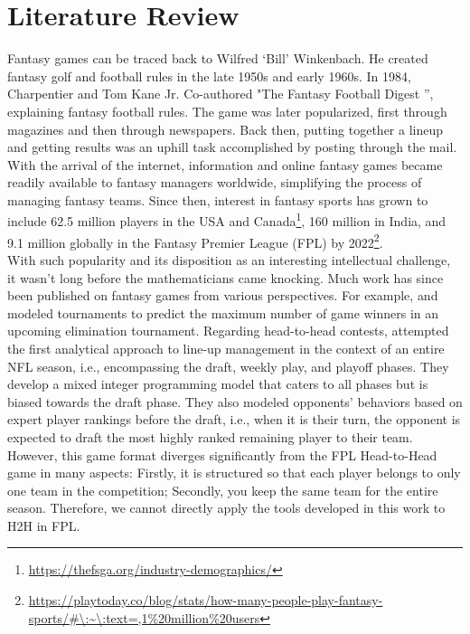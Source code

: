 \documentclass[12pt,oneside,a4paper]{book}
\theoremstyle{definition}
\theoremstyle{remark}
\begin{document}
		\chapter{Literature Review}
			Fantasy games can be traced back to Wilfred ‘Bill’ Winkenbach. He created fantasy golf and football rules in the late 1950s and early 1960s. In 1984, Charpentier and Tom Kane Jr. Co-authored "The Fantasy Football Digest '', explaining fantasy football rules. The game was later popularized, first through magazines and then through newspapers.  Back then, putting together a lineup and getting results was an uphill task accomplished by posting through the mail. With the arrival of the internet, information and online fantasy games became readily available to fantasy managers worldwide, simplifying the process of managing fantasy teams. Since then, interest in fantasy sports has grown to include 62.5 million players in the USA and Canada\footnote{\url{https://thefsga.org/industry-demographics/}}, 160 million in India, and 9.1 million globally in the Fantasy Premier League (FPL) by 2022\footnote{\url{https://playtoday.co/blog/stats/how-many-people-play-fantasy-sports/\#\:\~\:text=,1\%20million\%20users}}.
			\\
			With such popularity and its disposition as an interesting intellectual challenge, it wasn’t long before the mathematicians came knocking. Much work has since been published on fantasy games from various perspectives. For example, \cite{Kaplan_Garstka_2001}  and \citet{Clair_Letscher_2007} modeled tournaments to predict the maximum number of game winners in an upcoming elimination tournament. Regarding head-to-head contests, \cite{becker2016analytical} attempted the first analytical approach to line-up management in the context of an entire NFL season, i.e., encompassing the draft, weekly play, and playoff phases. They develop a mixed integer programming model that caters to all phases but is biased towards the draft phase. They also modeled opponents' behaviors based on expert player rankings before the draft, i.e., when it is their turn, the opponent is expected to draft the most highly ranked remaining player to their team. However, this game format diverges significantly from the FPL Head-to-Head game in many aspects: Firstly, it is structured so that each player belongs to only one team in the competition; Secondly, you keep the same team for the entire season. Therefore, we cannot directly apply the tools developed in this work to H2H in FPL.
			\\
\end{document}
